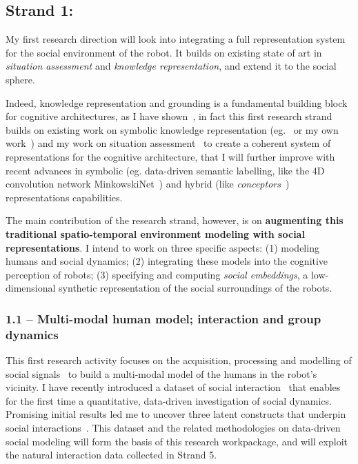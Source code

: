 \subsection{Strand 1: \textbf{\wpTwo}}

My first research direction will look into integrating a full representation
system for the social environment of the robot. It builds on existing state of
art in \emph{situation assessment} and \emph{knowledge representation}, and
extend it to the social sphere.

Indeed, knowledge representation and grounding is a fundamental building block
for cognitive architectures, as I have
shown~\parencite{lemaignan2017artificial}, in fact this first research strand
builds on existing work on symbolic knowledge representation
(eg.~\parencite{tenorth2009knowrob} or my own work~\parencite{lemaignan2010oro})
and my work on situation assessment~\parencite{lemaignan2018underworlds,
sallami2019simulation} to create a coherent system of representations for the
cognitive architecture, that I will further improve with recent advances in symbolic
(eg.  data-driven semantic labelling, like the 4D convolution network
MinkowskiNet~\parencite{choy20194d}) and hybrid (like
\emph{conceptors}~\parencite{jaeger2014controlling}) representations
capabilities.

The main contribution of the research strand, however, is on \textbf{augmenting
this traditional spatio-temporal environment modeling with social
representations}. I intend to work on three specific aspects: (1) modeling humans
and social dynamics; (2) integrating these models into the cognitive perception
of robots; (3) specifying and computing \emph{social embeddings}, a
low-dimensional synthetic representation of the social surroundings of the
robots.

\subsubsection{1.1 -- Multi-modal human model; interaction and group dynamics}

This first research activity focuses on the acquisition, processing and modelling of social
signals~\parencite{gunes2017automatic} to build a multi-modal model of the humans
in the robot's vicinity. I have recently introduced a dataset of social
interaction~\parencite{lemaignan2018pinsoro} that enables for the first time a
quantitative, data-driven investigation of social dynamics. Promising initial
results led me to uncover three latent constructs that underpin social
interactions~\parencite{bartlett2019what}. This dataset and the related methodologies
on data-driven social modeling will form the basis of this research workpackage,
and will exploit the natural interaction data collected in Strand 5.


